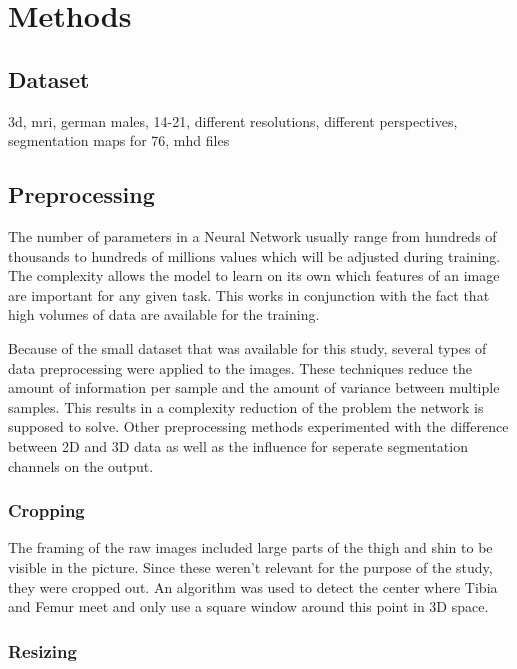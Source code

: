 \section{Methods}

\subsection{Dataset}

3d, mri, german males, 14-21, different resolutions, different perspectives, segmentation maps for 76, mhd files



\subsection{Preprocessing}

The number of parameters in a Neural Network usually range from hundreds of thousands to hundreds of millions values which will be adjusted during training. The complexity allows the model to learn on its own which features of an image are important for any given task. This works in conjunction with the fact that high volumes of data are available for the training.

Because of the small dataset that was available for this study, several types of data preprocessing were applied to the images. These techniques reduce the amount of information per sample and the amount of variance between multiple samples. This results in a complexity reduction of the problem the network is supposed to solve. Other preprocessing methods experimented with the difference between 2D and 3D data as well as the influence for seperate segmentation channels on the output.

\subsubsection{Cropping}

The framing of the raw images included large parts of the thigh and shin to be visible in the picture. Since these weren't relevant for the purpose of the study, they were cropped out. An algorithm was used to detect the center where Tibia and Femur meet and only use a square window around this point in 3D space.

\subsubsection{Resizing}

